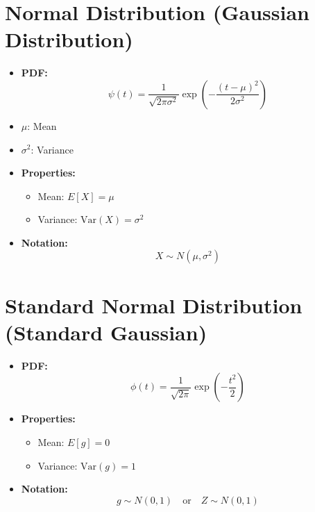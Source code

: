 \documentclass{article}
\begin{document}
\section*{Normal Distribution (Gaussian Distribution)}

\begin{itemize}
    \item \textbf{PDF:}
    \[
    \psi(t) = \frac{1}{\sqrt{2\pi\sigma^2}} \exp\left(-\frac{(t - \mu)^2}{2\sigma^2}\right)
    \]

    \item \(\mu\): Mean
    \item \(\sigma^2\): Variance

    \item \textbf{Properties:}
    \begin{itemize}
        \item Mean: \(E[X] = \mu\)
        \item Variance: \(\text{Var}(X) = \sigma^2\)
    \end{itemize}

    \item \textbf{Notation:}
    \[
    X \sim N(\mu, \sigma^2)
    \]
\end{itemize}

\section*{Standard Normal Distribution (Standard Gaussian)}

\begin{itemize}
    \item \textbf{PDF:}
    \[
    \phi(t) = \frac{1}{\sqrt{2\pi}} \exp\left(-\frac{t^2}{2}\right)
    \]

    \item \textbf{Properties:}
    \begin{itemize}
        \item Mean: \(E[g] = 0\)
        \item Variance: \(\text{Var}(g) = 1\)
    \end{itemize}

    \item \textbf{Notation:}
    \[
    g \sim N(0, 1) \quad \text{or} \quad Z \sim N(0, 1)
    \]
\end{itemize}
\end{document}
